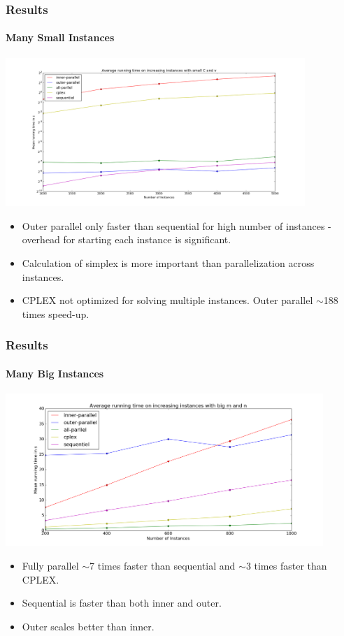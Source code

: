 \documentclass{beamer}
\begin{document}
\begin{frame}[fragile]
\frametitle{Results}
\framesubtitle{Many Small Instances}
\centering
\includegraphics[width=0.85\textwidth]{../Doc/figures/many-small}
\begin{itemize}
	\item Outer parallel only faster than sequential for high number of instances - overhead for starting each instance is significant.
	\item Calculation of simplex is more important than parallelization across instances.
	\item CPLEX not optimized for solving multiple instances. Outer parallel $\sim$188 times speed-up.
\end{itemize}
\end{frame}

\begin{frame}[fragile]
\frametitle{Results}
\framesubtitle{Many Big Instances}
\centering
\includegraphics[width=0.9\textwidth]{../Doc/figures/many-big}
\begin{itemize}
	\item Fully parallel $\sim$7 times faster than sequential and $\sim$3 times faster than CPLEX.
	\item Sequential is faster than both inner and outer.
	\item Outer scales better than inner.
\end{itemize}
\end{frame}
\end{document}
